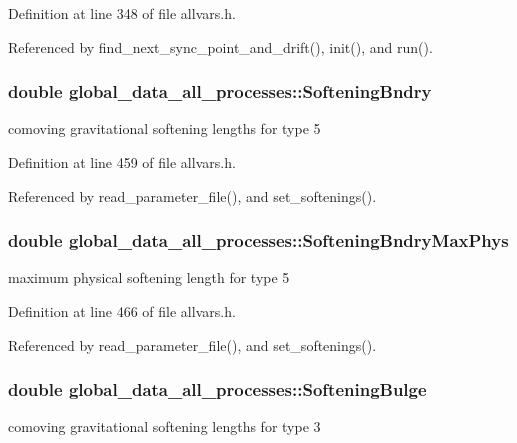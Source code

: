 Definition at line 348 of file allvars.h.



Referenced by find\_\-next\_\-sync\_\-point\_\-and\_\-drift(), init(), and run().

\hypertarget{structglobal__data__all__processes_a8c31c4a347bca34b4e8d2292f710596d}{
\subsubsection[{SofteningBndry}]{\setlength{\rightskip}{0pt plus 5cm}double {\bf global\_\-data\_\-all\_\-processes::SofteningBndry}}}
\label{structglobal__data__all__processes_a8c31c4a347bca34b4e8d2292f710596d}
comoving gravitational softening lengths for type 5 

Definition at line 459 of file allvars.h.



Referenced by read\_\-parameter\_\-file(), and set\_\-softenings().

\hypertarget{structglobal__data__all__processes_af989ac3052ad7e6bf7d7bfc824274715}{
\subsubsection[{SofteningBndryMaxPhys}]{\setlength{\rightskip}{0pt plus 5cm}double {\bf global\_\-data\_\-all\_\-processes::SofteningBndryMaxPhys}}}
\label{structglobal__data__all__processes_af989ac3052ad7e6bf7d7bfc824274715}
maximum physical softening length for type 5 

Definition at line 466 of file allvars.h.



Referenced by read\_\-parameter\_\-file(), and set\_\-softenings().

\hypertarget{structglobal__data__all__processes_a1a0c9ca2f3dfdb2371785b66ced141d7}{
\subsubsection[{SofteningBulge}]{\setlength{\rightskip}{0pt plus 5cm}double {\bf global\_\-data\_\-all\_\-processes::SofteningBulge}}}
\label{structglobal__data__all__processes_a1a0c9ca2f3dfdb2371785b66ced141d7}
comoving gravitational softening lengths for type 3 

